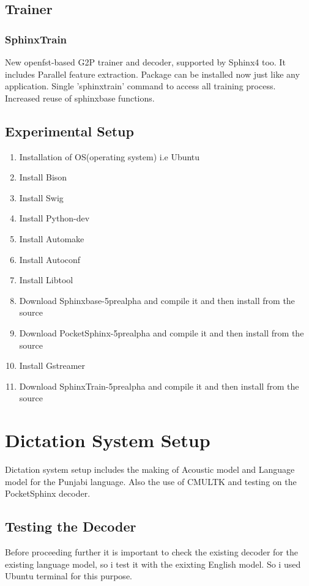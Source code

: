 \documentclass[12pt,a4paper,oldfontcommands]{memoir}
\begin{document}
\subsection{Trainer}
\subsubsection{SphinxTrain}
 New openfst-based G2P trainer and decoder, supported by Sphinx4 too. It includes Parallel feature extraction.  Package can be installed now just like any application. Single 'sphinxtrain' command to access all training process. Increased reuse of sphinxbase functions\cite{30}.

\subsection{Experimental Setup}

\begin{enumerate}
  \item Installation of OS(operating system) i.e Ubuntu
  \item Install Bison 
  \item Install Swig
  \item Install Python-dev
  \item Install Automake 
  \item Install Autoconf
  \item Install Libtool
  \item Download Sphinxbase-5prealpha and compile it and then install from the source
  \item Download PocketSphinx-5prealpha and compile it and then install from the source
  \item Install Gstreamer  
  \item Download SphinxTrain-5prealpha and compile it and then install from the source	
\end{enumerate}

\section{Dictation System Setup}
Dictation system setup includes the making of Acoustic model and Language model for the Punjabi language. Also the use of CMULTK and testing on the PocketSphinx decoder.

\subsection{Testing the Decoder}
Before proceeding further it is important to check the existing decoder for the existing language model, so i test it with the exixting English model.
So i used Ubuntu terminal for this purpose.\\ 
\end{document}
